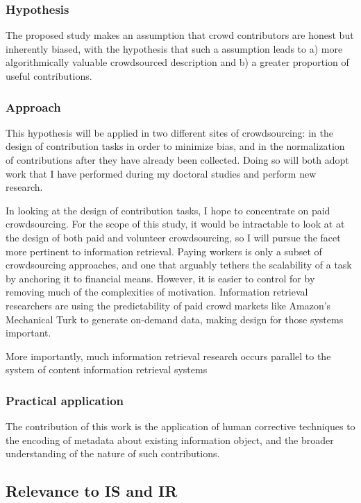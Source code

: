 \subsubsection{Hypothesis}\label{hypothesis}

The proposed study makes an assumption that crowd contributors are
honest but inherently biased, with the hypothesis that such a assumption
leads to a) more algorithmically valuable crowdsourced description and
b) a greater proportion of useful contributions.

\subsubsection{Approach}\label{approach}

This hypothesis will be applied in two different sites of crowdsourcing:
in the design of contribution tasks in order to minimize bias, and in
the normalization of contributions after they have already been
collected. Doing so will both adopt work that I have performed during my
doctoral studies and perform new research.

In looking at the design of contribution tasks, I hope to concentrate on
paid crowdsourcing. For the scope of this study, it would be intractable
to look at at the design of both paid and volunteer crowdsourcing, so I
will pursue the facet more pertinent to information retrieval. Paying
workers is only a subset of crowdsourcing approaches, and one that
arguably tethers the scalability of a task by anchoring it to financial
means. However, it is easier to control for by removing much of the
complexities of motivation. Information retrieval researchers are using
the predictability of paid crowd markets like Amazon's Mechanical Turk
to generate on-demand data, making design for those systems important.

More importantly, much information retrieval research occurs parallel to
the system of content information retrieval systems

\subsubsection{Practical application}\label{practical-application}

The contribution of this work is the application of human corrective
techniques to the encoding of metadata about existing information
object, and the broader understanding of the nature of such
contributions.

\subsection{Relevance to IS and IR}\label{relevance-to-is-and-ir}

